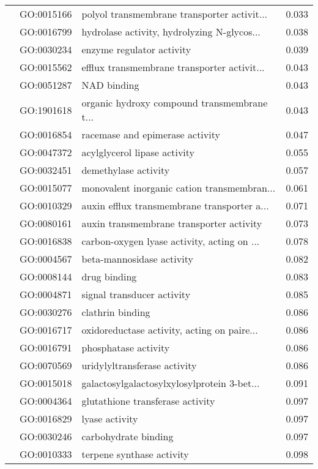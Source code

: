 \begin{longtable}{lllr}
   & GO:0015166 &  polyol transmembrane transporter activit... &         0.033 \\
   & GO:0016799 &  hydrolase activity, hydrolyzing N-glycos... &         0.038 \\
   & GO:0030234 &                    enzyme regulator activity &         0.039 \\
   & GO:0015562 &  efflux transmembrane transporter activit... &         0.043 \\
   & GO:0051287 &                                  NAD binding &         0.043 \\
   & GO:1901618 &  organic hydroxy compound transmembrane t... &         0.043 \\
   & GO:0016854 &              racemase and epimerase activity &         0.047 \\
   & GO:0047372 &                 acylglycerol lipase activity &         0.055 \\
   & GO:0032451 &                         demethylase activity &         0.057 \\
   & GO:0015077 &  monovalent inorganic cation transmembran... &         0.061 \\
   & GO:0010329 &  auxin efflux transmembrane transporter a... &         0.071 \\
   & GO:0080161 &     auxin transmembrane transporter activity &         0.073 \\
   & GO:0016838 &  carbon-oxygen lyase activity, acting on ... &         0.078 \\
   & GO:0004567 &                    beta-mannosidase activity &         0.082 \\
   & GO:0008144 &                                 drug binding &         0.083 \\
   & GO:0004871 &                   signal transducer activity &         0.085 \\
   & GO:0030276 &                             clathrin binding &         0.086 \\
   & GO:0016717 &  oxidoreductase activity, acting on paire... &         0.086 \\
   & GO:0016791 &                         phosphatase activity &         0.086 \\
   & GO:0070569 &                 uridylyltransferase activity &         0.086 \\
   & GO:0015018 &  galactosylgalactosylxylosylprotein 3-bet... &         0.091 \\
   & GO:0004364 &             glutathione transferase activity &         0.097 \\
   & GO:0016829 &                               lyase activity &         0.097 \\
   & GO:0030246 &                         carbohydrate binding &         0.097 \\
   & GO:0010333 &                    terpene synthase activity &         0.098 \\
\end{longtable}
